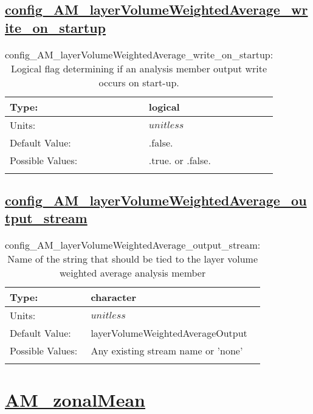 \subsection[config\_AM\_layerVolumeWeightedAverage\_write\_on\_startup]{\hyperref[sec:nm_tab_AM_layerVolumeWeightedAverage]{config\_AM\_layerVolumeWeightedAverage\_write\_on\_startup}}
\label{subsec:nm_sec_config_AM_layerVolumeWeightedAverage_write_on_startup}
\begin{center}
\begin{longtable}{| p{2.0in} || p{4.0in} |}
    \hline
    Type: & logical \\
    \hline
    Units: & $unitless$ \\
    \hline
    Default Value: & .false. \\
    \hline
    Possible Values: & .true. or .false. \\
    \hline
    \caption{config\_AM\_layerVolumeWeightedAverage\_write\_on\_startup: Logical flag determining if an analysis member output write occurs on start-up.}
\end{longtable}
\end{center}
\subsection[config\_AM\_layerVolumeWeightedAverage\_output\_stream]{\hyperref[sec:nm_tab_AM_layerVolumeWeightedAverage]{config\_AM\_layerVolumeWeightedAverage\_output\_stream}}
\label{subsec:nm_sec_config_AM_layerVolumeWeightedAverage_output_stream}
\begin{center}
\begin{longtable}{| p{2.0in} || p{4.0in} |}
    \hline
    Type: & character \\
    \hline
    Units: & $unitless$ \\
    \hline
    Default Value: & layerVolumeWeightedAverageOutput \\
    \hline
    Possible Values: & Any existing stream name or 'none' \\
    \hline
    \caption{config\_AM\_layerVolumeWeightedAverage\_output\_stream: Name of the string that should be tied to the layer volume weighted average analysis member}
\end{longtable}
\end{center}
\section[AM\_zonalMean]{\hyperref[sec:nm_tab_AM_zonalMean]{AM\_zonalMean}}
\label{sec:nm_sec_AM_zonalMean}
